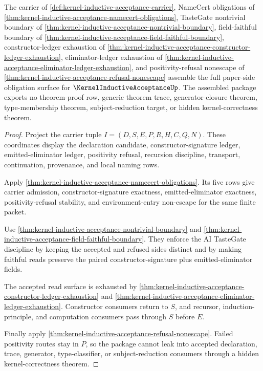 \begin{theorem}
\label{thm:kernel-inductive-acceptance-obligation-closure-package}
The carrier of \autoref{def:kernel-inductive-acceptance-carrier}, NameCert obligations of \autoref{thm:kernel-inductive-acceptance-namecert-obligations}, TasteGate nontrivial boundary of \autoref{thm:kernel-inductive-acceptance-nontrivial-boundary}, field-faithful boundary of \autoref{thm:kernel-inductive-acceptance-field-faithful-boundary}, constructor-ledger exhaustion of \autoref{thm:kernel-inductive-acceptance-constructor-ledger-exhaustion}, eliminator-ledger exhaustion of \autoref{thm:kernel-inductive-acceptance-eliminator-ledger-exhaustion}, and positivity-refusal nonescape of \autoref{thm:kernel-inductive-acceptance-refusal-nonescape} assemble the full paper-side obligation surface for $\KernelInductiveAcceptanceUp$. The assembled package exports no theorem-proof row, generic theorem trace, generator-closure theorem, type-membership theorem, subject-reduction target, or hidden kernel-correctness theorem.
\end{theorem}
\begin{proof}
Project the carrier tuple $I=(D,S,E,P,R,H,C,Q,N)$. These coordinates display the declaration candidate, constructor-signature ledger, emitted-eliminator ledger, positivity refusal, recursion discipline, transport, continuation, provenance, and local naming rows.

Apply \autoref{thm:kernel-inductive-acceptance-namecert-obligations}. Its five rows give carrier admission, constructor-signature exactness, emitted-eliminator exactness, positivity-refusal stability, and environment-entry non-escape for the same finite packet.

Use \autoref{thm:kernel-inductive-acceptance-nontrivial-boundary} and \autoref{thm:kernel-inductive-acceptance-field-faithful-boundary}. They enforce the AI TasteGate discipline by keeping the accepted and refused sides distinct and by making faithful reads preserve the paired constructor-signature plus emitted-eliminator fields.

The accepted read surface is exhausted by \autoref{thm:kernel-inductive-acceptance-constructor-ledger-exhaustion} and \autoref{thm:kernel-inductive-acceptance-eliminator-ledger-exhaustion}. Constructor consumers return to $S$, and recursor, induction-principle, and computation consumers pass through $S$ before $E$.

Finally apply \autoref{thm:kernel-inductive-acceptance-refusal-nonescape}. Failed positivity routes stay in $P$, so the package cannot leak into accepted declaration, trace, generator, type-classifier, or subject-reduction consumers through a hidden kernel-correctness theorem.
\end{proof}

